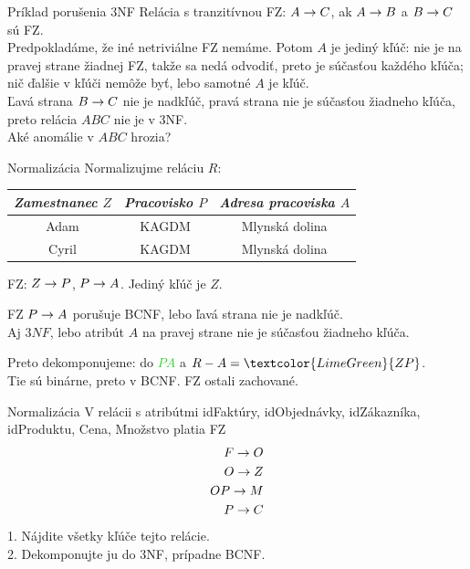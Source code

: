 \documentclass[12pt]{beamer}
\def\green#1{\textcolor{LimeGreen}{#1}}
\begin{document}
\begin{frame}[fragile]{Príklad porušenia 3NF}
Relácia s \alert{tranzitívnou} FZ: $A\rightarrow C$, ak $A\rightarrow B$ a $B\rightarrow C$ sú FZ.\\[5mm]
Predpokladáme, že iné netriviálne FZ nemáme.
Potom $A$ je jediný kľúč: nie je na pravej strane žiadnej FZ,
takže sa nedá odvodiť, preto je súčasťou každého kľúča;
nič ďalšie v kľúči nemôže byť, lebo samotné $A$ je kľúč.\\[5mm]

Ľavá strana $B\rightarrow C$ nie je nadkľúč, pravá strana nie je súčasťou žiadneho kľúča,
preto relácia $ABC$ nie je v 3NF.\\[5mm]

Aké anomálie v $ABC$ hrozia?
\end{frame}

\begin{frame}[fragile]{Normalizácia}
Normalizujme reláciu $R$:\\[2mm]
\begin{tabular}{|c|c|c|}
\hline
\emph{Zamestnanec $Z$} & \emph{Pracovisko $P$} & \emph{Adresa pracoviska $A$} \\\hline
Adam & KAGDM & Mlynská dolina \\\hline
Cyril & KAGDM & Mlynská dolina \\\hline
\end{tabular}
\pause

\bigskip
FZ: $Z\rightarrow P$, $P\rightarrow A$. Jediný kľúč je $Z$.

\bigskip
FZ \alert{$P\rightarrow A$} porušuje BCNF, lebo ľavá strana nie je nadkľúč.\\
Aj $3NF$, lebo atribút $A$ na pravej strane nie je súčasťou žiadneho kľúča.

\bigskip
Preto dekomponujeme: do \green{$PA$} a $R - A = \green{ZP}$.\\
Tie sú binárne, preto v BCNF. FZ ostali zachované.
\end{frame}

\begin{frame}[fragile]{Normalizácia}
V relácii s atribútmi idFaktúry, idObjednávky, idZákazníka, idProduktu, Cena, Množstvo platia FZ
\begin{eqnarray*}
F\rightarrow O\\
O\rightarrow Z\\
OP\rightarrow M\\
P\rightarrow C
\end{eqnarray*}
1. Nájdite všetky kľúče tejto relácie.\\
2. Dekomponujte ju do 3NF, prípadne BCNF.
\end{frame}
\end{document}
